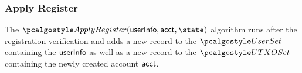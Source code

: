 \subsubsection{Apply Register}


The $\applyreg(\userinfo, \acct, \state)$ algorithm runs after the registration verification and adds a new record to the $\usersset$ containing the $\textup{\textsf{userInfo}}$ as well as a new record to the $\utxoset$ containing the newly created account $\textup{\textsf{acct}}$. 


